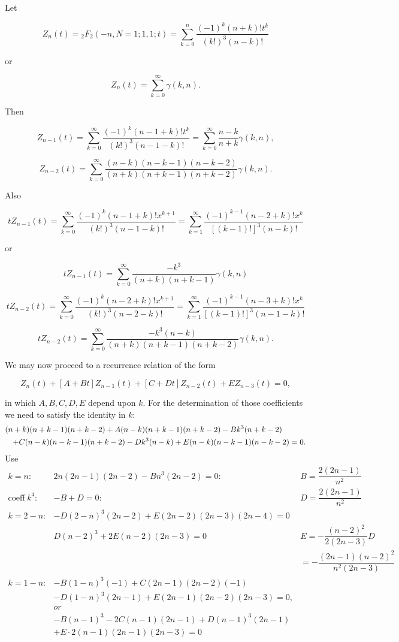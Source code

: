 \begin{solution}
Let

$$Z_n(t) = {}_2F_2(-n,N=1;1,1;t) = \displaystyle\sum_{k=0}^n \dfrac{(-1)^k (n+k)! t^k}{(k!)^3(n-k)!}$$

or

$$Z_n(t) = \displaystyle\sum_{k=0}^{\infty} \gamma(k,n).$$

Then

$$Z_{n-1}(t) = \displaystyle\sum_{k=0}^{\infty} \dfrac{(-1)^k (n-1+k)!t^k}{(k!)^3(n-1-k)!} = \displaystyle\sum_{k=0}^{\infty} \dfrac{n-k}{n+k} \gamma(k,n),$$

$$Z_{n-2}(t) = \displaystyle\sum_{k=0}^{\infty} \dfrac{(n-k)(n-k-1)(n-k-2)}{(n+k)(n+k-1)(n+k-2)} \gamma(k,n).$$

Also

$$t Z_{n-1}(t) = \displaystyle\sum_{k=0}^{\infty} \dfrac{(-1)^k (n-1+k)! x^{k+1}}{(k!)^3(n-1-k)!} = \displaystyle\sum_{k=1}^{\infty} \dfrac{(-1)^{k-1}(n-2+k)! x^k}{[(k-1)!]^3(n-k)!}$$

or

$$t Z_{n-1}(t) = \displaystyle\sum_{k=0}^{\infty} \dfrac{-k^3}{(n+k)(n+k-1)} \gamma(k,n)$$

$$t Z_{n-2}(t) = \displaystyle\sum_{k=0}^{\infty} \dfrac{(-1)^k (n-2+k)! x^{k+1}}{(k!)^3(n-2-k)!} = \displaystyle\sum_{k=1}^{\infty} \dfrac{(-1)^{k-1} (n-3+k)!x^k}{[(k-1)!]^3(n-1-k)!}$$

$$t Z_{n-2}(t) = \displaystyle\sum_{k=0}^{\infty} \dfrac{-k^3(n-k)}{(n+k)(n+k-1)(n+k-2)} \gamma(k,n).$$

We may now proceed to a recurrence relation of the form

$$Z_n(t) + [A+Bt]Z_{n-1}(t) + [C+Dt]Z_{n-2}(t) + E Z_{n-3}(t)=0,$$

in which $A,B,C,D,E$ depend upon $k$. For the determination of those coefficients we need to satisfy the identity in $k$:
\begin{eqnarray*}
\lefteqn{(n+k)(n+k-1)(n+k-2)+A(n-k)(n+k-1)(n+k-2)-Bk^3(n+k-2)} \\
& & +C(n-k)(n-k-1)(n+k-2)-Dk^3(n-k)+E(n-k)(n-k-1)(n-k-2)=0.
\end{eqnarray*}
Use
$$\begin{array}{l|l|l}
k=n: & 2n(2n-1)(2n-2)-Bn^3(2n-2) = 0: & B= \dfrac{2(2n-1)}{n^2} \\
\mathrm{coeff} \hspace{3pt} k^4: &-B+D=0: & D = \dfrac{2(2n-1)}{n^2} \\
k=2-n: & -D (2-n)^3(2n-2) + E(2n-2)(2n-3)(2n-4)=0 \\
& D(n-2)^3 + 2E(n-2)(2n-3)=0 & E = -\dfrac{(n-2)^2}{2(2n-3)}D  \\
&& = -\dfrac{(2n-1)(n-2)^2}{n^2 (2n-3)} \\
k=1-n: & -B(1-n)^3(-1) + C(2n-1)(2n-2)(-1) \\
& -D(1-n)^3(2n-1)+E(2n-1)(2n-2)(2n-3)=0, \\
& or \\
& -B(n-1)^3 - 2C(n-1)(2n-1) + D(n-1)^3(2n-1) \\
& + E \cdot 2 (n-1)(2n-1)(2n-3) =0
\end{array}$$


\end{solution}

